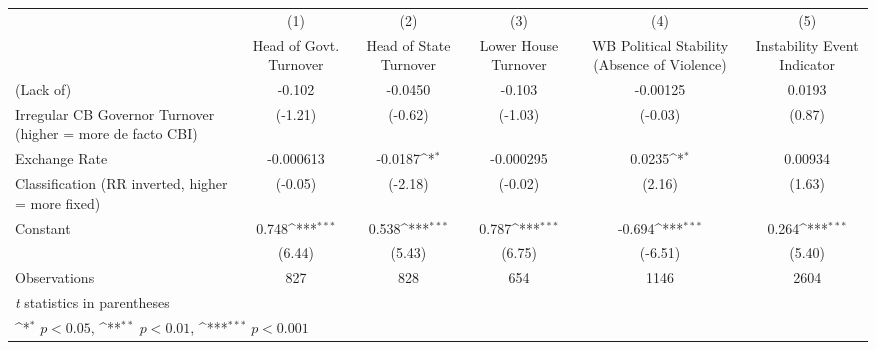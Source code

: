 {
\def\sym#1{\ifmmode^{#1}\else\(^{#1}\)\fi}
\begin{tabular}{l*{5}{c}}
\toprule
                &\multicolumn{1}{c}{(1)}&\multicolumn{1}{c}{(2)}&\multicolumn{1}{c}{(3)}&\multicolumn{1}{c}{(4)}&\multicolumn{1}{c}{(5)}\\
                &\multicolumn{1}{c}{Head of Govt. Turnover}&\multicolumn{1}{c}{Head of State Turnover}&\multicolumn{1}{c}{Lower House Turnover}&\multicolumn{1}{c}{WB Political Stability (Absence of Violence)}&\multicolumn{1}{c}{Instability Event Indicator}\\
\midrule
(Lack of)       &   -0.102         &  -0.0450         &   -0.103         & -0.00125         &   0.0193         \\
Irregular CB Governor Turnover (higher = more de facto CBI)&  (-1.21)         &  (-0.62)         &  (-1.03)         &  (-0.03)         &   (0.87)         \\
\addlinespace
Exchange Rate   &-0.000613         &  -0.0187\sym{*}  &-0.000295         &   0.0235\sym{*}  &  0.00934         \\
Classification (RR inverted, higher = more fixed)&  (-0.05)         &  (-2.18)         &  (-0.02)         &   (2.16)         &   (1.63)         \\
\addlinespace
Constant        &    0.748\sym{***}&    0.538\sym{***}&    0.787\sym{***}&   -0.694\sym{***}&    0.264\sym{***}\\
                &   (6.44)         &   (5.43)         &   (6.75)         &  (-6.51)         &   (5.40)         \\
\midrule
Observations    &      827         &      828         &      654         &     1146         &     2604         \\
\bottomrule
\multicolumn{6}{l}{\footnotesize \textit{t} statistics in parentheses}\\
\multicolumn{6}{l}{\footnotesize \sym{*} \(p<0.05\), \sym{**} \(p<0.01\), \sym{***} \(p<0.001\)}\\
\end{tabular}
}
